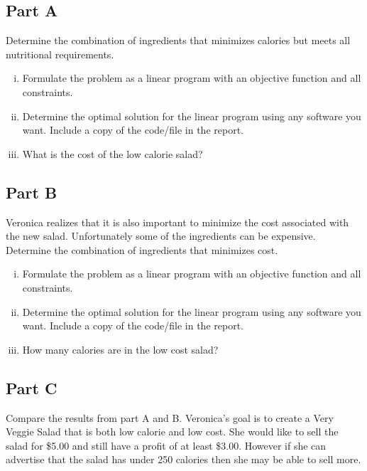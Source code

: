 \documentclass[../main.tex]{subfiles}
\begin{document}
\subsection*{Part A}
Determine the combination of ingredients that minimizes calories but meets all nutritional requirements.

\begin{enumerate}[i.]
	\item Formulate the problem as a linear program with an objective function and all constraints.

	\item Determine the optimal solution for the linear program using any software you want. Include a copy of the code/file in the report.

	\item What is the cost of the low calorie salad?
\end{enumerate}

\subsection*{Part B}
Veronica realizes that it is also important to minimize the cost associated with the new salad. Unfortunately some of the ingredients can be expensive. Determine the combination of ingredients that minimizes cost.

\begin{enumerate}[i.]
	\item Formulate the problem as a linear program with an objective function and all constraints.

	\item Determine the optimal solution for the linear program using any software you want. Include a copy of the code/file in the report.

	\item How many calories are in the low cost salad?
\end{enumerate}

\subsection*{Part C}
Compare the results from part A and B. Veronica’s goal is to create a Very Veggie Salad that is both low calorie and low cost. She would like to sell the salad for \$5.00 and still have a profit of at least \$3.00. However if she can advertise that the salad has under 250 calories then she may be able to sell more.
\end{document}
